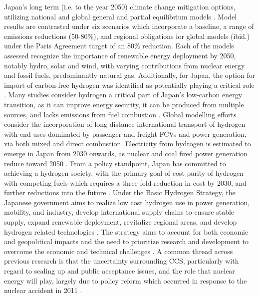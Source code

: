 Japan's long term (i.e. to the year 2050) climate change mitigation options, utilizing national and global general and partial equilibrium models \cite{sugiyama_japans_2019}. Model results are contrasted under six scenarios which incorporate a baseline, a range of emissions reductions (50-80\%), and regional obligations for global models (ibid.) under the Paris Agreement target of an 80\% reduction. Each of the models assessed recognize the importance of renewable energy deployment by 2050, notably hydro, solar and wind, with varying contributions from nuclear energy and fossil fuels, predominantly natural gas. Additionally, for Japan, the option for import of carbon-free hydrogen was identified as potentially playing a critical role \cite{sato_consideration_2005, akimoto_estimates_2010, matsuo_global_2013, oshiro_diffusion_2015, oshiro_diffusion_2015, sugiyama_japans_2019}. Many studies consider hydrogen a critical part of Japan's low-carbon energy transition, as it can improve energy security, it can be produced from multiple sources, and lacks emissions from fuel combustion \cite{iida_hydrogen_2019}. Global modelling efforts consider the incorporation of long-distance international transport of hydrogen with end uses dominated by passenger and freight \gls{FCV}s and power generation, via both mixed and direct combustion. Electricity from hydrogen is estimated to emerge in Japan from 2030 onwards, as nuclear and coal fired power generation reduce toward 2050 \cite{ishimoto_significance_2017}. From a policy standpoint, Japan has committed to achieving a hydrogen society, with the primary goal of cost parity of hydrogen with competing fuels which requires a three-fold reduction in cost by 2030, and further reductions into the future \cite{nagashima_japans_2018}. Under the Basic Hydrogen Strategy, the Japanese government aims to realize low cost hydrogen use in power generation, mobility, and industry, develop international supply chains to ensure stable supply, expand renewable deployment, revitalize regional areas, and develop hydrogen related technologies \cite{noauthor_basic_2017}. The strategy aims to account for both economic and geopolitical impacts and the need to prioritize research and development to overcome the economic and technical challenges \cite{nagashima_japans_2018}. A common thread across previous research is that the uncertainty surrounding \gls{CCS}, particularly with regard to scaling up and public acceptance issues, and the role that nuclear energy will play, largely due to policy reform which occurred in response to the nuclear accident in 2011 \cite{oshiro_mid-century_2019}.


